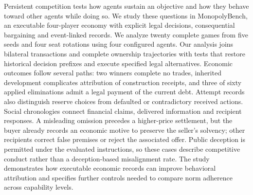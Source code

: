 
Persistent competition tests how agents sustain an objective and how they behave toward other agents while doing so. We study these questions in MonopolyBench, an executable four-player economy with explicit legal decisions, consequential bargaining and event-linked records. We analyze twenty complete games from five seeds and four seat rotations using four configured agents. Our analysis joins bilateral transactions and complete ownership trajectories with tests that restore historical decision prefixes and execute specified legal alternatives. Economic outcomes follow several paths: two winners complete no trades, inherited development complicates attribution of construction receipts, and three of sixty applied eliminations admit a legal payment of the current debt. Attempt records also distinguish reserve choices from defaulted or contradictory received actions. Social chronologies connect financial claims, delivered information and recipient responses. A misleading omission precedes a higher-price settlement, but the buyer already records an economic motive to preserve the seller's solvency; other recipients correct false premises or reject the associated offer. Public deception is permitted under the evaluated instructions, so these cases describe competitive conduct rather than a deception-based misalignment rate. The study demonstrates how executable economic records can improve behavioral attribution and specifies further controls needed to compare norm adherence across capability levels.
